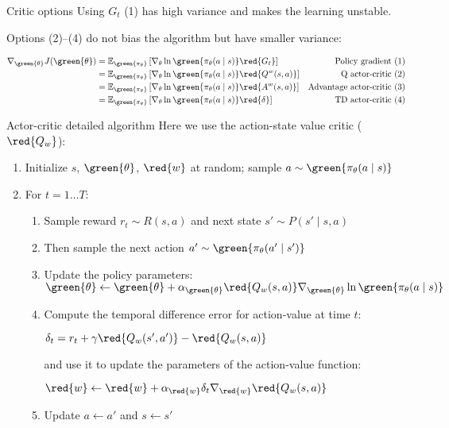 \begin{frame}{Critic options}
  Using $G_t$ (1) has high variance and makes the learning unstable.

  Options (2)--(4) do not bias the algorithm but have smaller variance:

  \begin{align*}
    \nabla_{\green{\theta}} J(\green{\theta}) & = \mathbb{E}_{\green{\pi_\theta}} \left[\nabla_\theta \ln \green{\pi_\theta(a \mid s)}\red{G_t}\right] & \text{Policy gradient (1)} \\
    & = \mathbb{E}_{\green{\pi_\theta}} \left[\nabla_\theta \ln \green{\pi_\theta(a \mid s)}\red{Q^w(s, a)}\right] & \text{Q actor-critic (2)} \\
    & = \mathbb{E}_{\green{\pi_\theta}} \left[\nabla_\theta \ln \green{\pi_\theta(a \mid s)}\red{A^w(s, a)}\right] & \text{Advantage actor-critic (3)} \\
    & = \mathbb{E}_{\green{\pi_\theta}} \left[\nabla_\theta \ln \green{\pi_\theta(a \mid s)}\red{\delta}\right] & \text{TD actor-critic (4)} \\
  \end{align*}
\end{frame}

\begin{frame}{Actor-critic detailed algorithm}
  Here we use the action-state value critic ($\red{Q_w}$):

  \begin{enumerate}[<+->]
    \item Initialize $s$, $\green{\theta}$, $\red{w}$ at random; sample $a \sim \green{\pi_\theta(a \mid s)}$
    \item For $t=1\dots T$:
      \begin{enumerate}
        \item Sample reward $r_t \sim R(s, a)$ and next state $s' \sim P(s' \mid s, a)$
        \item Then sample the next action $a' \sim \green{\pi_\theta(a' \mid s')}$
        \item Update the policy parameters: $\green{\theta} \leftarrow \green{\theta} + \alpha_{\green{\theta}} \red{Q_w(s, a)}\nabla_{\green{\theta}} \ln \green{\pi_\theta(a \mid s)}$
        \item Compute the temporal difference error for action-value at time $t$:

          $\delta_t = r_t + \gamma \red{Q_w(s', a')} - \red{Q_w(s, a)}$

          and use it to update the parameters of the action-value function:

          $\red{w} \leftarrow \red{w} + \alpha_{\red{w}} \delta_t\nabla_{\red{w}}\red{Q_w(s, a)}$
        \item Update $a \leftarrow a'$ and $s \leftarrow s'$
      \end{enumerate}
  \end{enumerate}
\end{frame}

